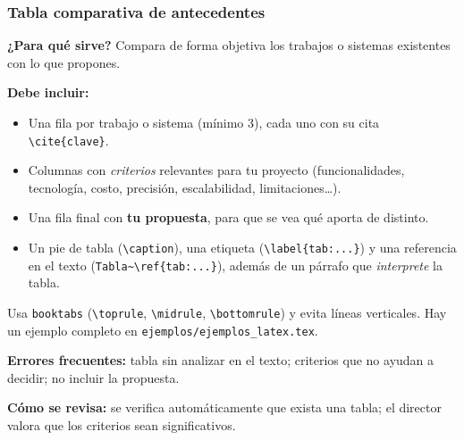 \subsubsection{Tabla comparativa de antecedentes} \label{subsec:tabla_comparativa_antecedentes} %

\begin{guia}
\textbf{¿Para qué sirve?} Compara de forma objetiva los trabajos o sistemas existentes con lo que propones.

\textbf{Debe incluir:}
\begin{itemize}[nosep,leftmargin=*]
  \item Una fila por trabajo o sistema (mínimo 3), cada uno con su cita \verb|\cite{clave}|.
  \item Columnas con \emph{criterios} relevantes para tu proyecto (funcionalidades, tecnología, costo, precisión,
        escalabilidad, limitaciones\ldots).
  \item Una fila final con \textbf{tu propuesta}, para que se vea qué aporta de distinto.
  \item Un pie de tabla (\verb|\caption|), una etiqueta (\verb|\label{tab:...}|) y una referencia en el texto
        (\verb|Tabla~\ref{tab:...}|), además de un párrafo que \emph{interprete} la tabla.
\end{itemize}
Usa \verb|booktabs| (\verb|\toprule|, \verb|\midrule|, \verb|\bottomrule|) y evita líneas verticales. Hay un ejemplo
completo en \texttt{ejemplos/ejemplos\_latex.tex}.

\textbf{Errores frecuentes:} tabla sin analizar en el texto; criterios que no ayudan a decidir; no incluir la propuesta.

\textbf{Cómo se revisa:} se verifica automáticamente que exista una tabla; el director valora que los criterios sean
significativos.
\end{guia}


